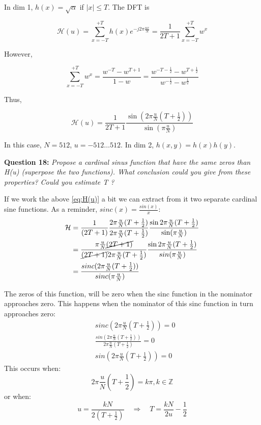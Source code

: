 \noindent In dim 1, $h(x) = \sqrt{\alpha}$ if $|x| \leq T$. The DFT is

\begin{equation}
\label{eq:DFT}
\mathcal{H}(u) = \sum_{x=-T}^{+T} h(x)e^{-j 2\pi \frac{ux}{N}} = \frac{1}{2T+1} \sum_{x=-T}^{+T} w^x
\end{equation}

However,

\[
\sum_{x=-T}^{+T} w^x = \frac{w^{-T} - w^{T+1}}{1 - w} = \frac{w^{-T-\frac{1}{2}} - w^{T+\frac{1}{2}}}{w^{-\frac{1}{2}} - w^{\frac{1}{2}}}
\]

Thus,

\begin{equation}
\label{eq:H(u)}
\mathcal{H}(u) = \frac{1}{2T+1} \frac{\sin\left(2\pi \frac{u}{N} (T + \frac{1}{2})\right)}{\sin\left(\pi \frac{u}{N}\right)}
\end{equation}

In this case, $N = 512$, $u = -512 \dots 512$. In dim 2, $h(x,y) = h(x)h(y)$.

\textbf{Question 18:}
\textit{Propose a cardinal sinus function that have the same zeros than H(u) (superpose the two functions). What conclusion could you give from these properties? Could you estimate T ?}

If we work the above \autoref{eq:H(u)} a bit we can extract from it two separate cardinal sine functions. As a reminder, $sinc(x) = \frac{sin(x)}{x}$:
\begin{equation}
\begin{split}    
    \mathcal{H} &= \frac{1}{(2T +1)} \frac{2 \pi \frac{u}{N}(T + \frac{1}{2})}{2 \pi \frac{u}{N}(T + \frac{1}{2})} \frac{\sin 2 \pi \frac{u}{N}(T + \frac{1}{2})}{\sin ( \pi \frac{u}{N})}
    \\
    &= \frac{\pi\frac{u}{N} \cancel{(2 T +1)}}{\cancel{(2T+1)}  2\pi \frac{u}{N}(T+\frac{1}{2})} 
    \frac{\sin 2 \pi \frac{u}{N}(T + \frac{1}{2})}{sin( \pi \frac{u}{N})}
    \\
    &= \frac{sinc (2 \pi \frac{u}{N}(T + \frac{1}{2}))}{sinc( \pi \frac{u}{N})}
\end{split}
\end{equation}

The zeros of this function, will be zero when the sinc function in the nominator approaches zero. This happens when the nominator of this sinc function in turn approaches zero:
\begin{equation}
\begin{split}
    &sinc (2 \pi \frac{u}{N}(T + \frac{1}{2})) = 0 \\
    & \frac{sin( 2 \pi \frac{u}{N}(T + \frac{1}{2}) )}{2 \pi \frac{u}{N}(T + \frac{1}{2})} = 0 \\
    & sin(2 \pi \frac{u}{N}(T + \frac{1}{2})) = 0
\end{split}
\end{equation}
This occurs when:
\[
2 \pi \frac{u}{N}(T + \frac{1}{2}) = k \pi, k \in \mathbb{Z}
\]
or when:
\begin{equation}
\label{eq:zeros}
u = \frac{k N}{2 (T + \frac{1}{2})}
\quad \Rightarrow \quad
T = \frac{k N}{2 u} - \frac{1}{2} 
\end{equation}

